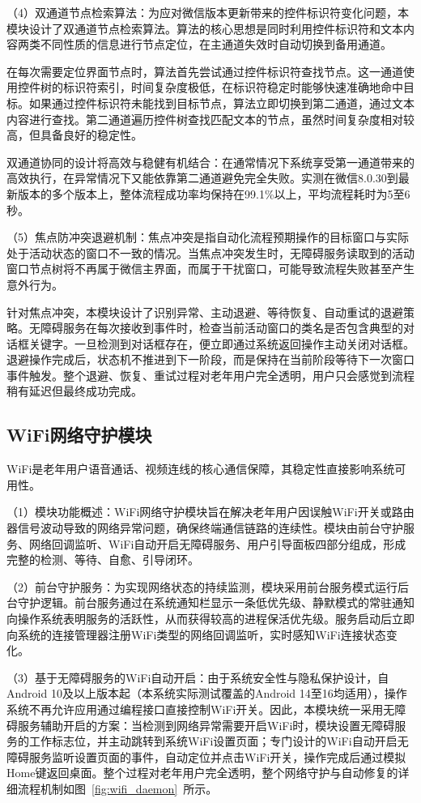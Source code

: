 （4）双通道节点检索算法：为应对微信版本更新带来的控件标识符变化问题，本模块设计了双通道节点检索算法。算法的核心思想是同时利用控件标识符和文本内容两类不同性质的信息进行节点定位，在主通道失效时自动切换到备用通道。

在每次需要定位界面节点时，算法首先尝试通过控件标识符查找节点。这一通道使用控件树的标识符索引，时间复杂度极低，在标识符稳定时能够快速准确地命中目标。如果通过控件标识符未能找到目标节点，算法立即切换到第二通道，通过文本内容进行查找。第二通道遍历控件树查找匹配文本的节点，虽然时间复杂度相对较高，但具备良好的稳定性。

双通道协同的设计将高效与稳健有机结合：在通常情况下系统享受第一通道带来的高效执行，在异常情况下又能依靠第二通道避免完全失败。实测在微信8.0.30到最新版本的多个版本上，整体流程成功率均保持在99.1\%以上，平均流程耗时为5至6秒。

（5）焦点防冲突退避机制：焦点冲突是指自动化流程预期操作的目标窗口与实际处于活动状态的窗口不一致的情况。当焦点冲突发生时，无障碍服务读取到的活动窗口节点树将不再属于微信主界面，而属于干扰窗口，可能导致流程失败甚至产生意外行为。

针对焦点冲突，本模块设计了识别异常、主动退避、等待恢复、自动重试的退避策略。无障碍服务在每次接收到事件时，检查当前活动窗口的类名是否包含典型的对话框关键字。一旦检测到对话框存在，便立即通过系统返回操作主动关闭对话框。退避操作完成后，状态机不推进到下一阶段，而是保持在当前阶段等待下一次窗口事件触发。整个退避、恢复、重试过程对老年用户完全透明，用户只会感觉到流程稍有延迟但最终成功完成。

\subsection{WiFi网络守护模块}

WiFi是老年用户语音通话、视频连线的核心通信保障，其稳定性直接影响系统可用性。

（1）模块功能概述：WiFi网络守护模块旨在解决老年用户因误触WiFi开关或路由器信号波动导致的网络异常问题，确保终端通信链路的连续性。模块由前台守护服务、网络回调监听、WiFi自动开启无障碍服务、用户引导面板四部分组成，形成完整的检测、等待、自愈、引导闭环。

（2）前台守护服务：为实现网络状态的持续监测，模块采用前台服务模式运行后台守护逻辑。前台服务通过在系统通知栏显示一条低优先级、静默模式的常驻通知向操作系统表明服务的活跃性，从而获得较高的进程保活优先级。服务启动后立即向系统的连接管理器注册WiFi类型的网络回调监听，实时感知WiFi连接状态变化。

（3）基于无障碍服务的WiFi自动开启：由于系统安全性与隐私保护设计，自 Android 10及以上版本起（本系统实际测试覆盖的Android 14至16均适用），操作系统不再允许应用通过编程接口直接控制WiFi开关。因此，本模块统一采用无障碍服务辅助开启的方案：当检测到网络异常需要开启WiFi时，模块设置无障碍服务的工作标志位，并主动跳转到系统WiFi设置页面；专门设计的WiFi自动开启无障碍服务监听设置页面的事件，自动定位并点击WiFi开关，操作完成后通过模拟Home键返回桌面。整个过程对老年用户完全透明，整个网络守护与自动修复的详细流程机制如图~\ref{fig:wifi_daemon}~所示。

